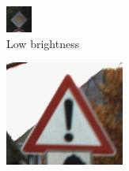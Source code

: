    \begin{figure}[H]
    \centering
    \begin{subfigure}{0.25\textwidth}
        \includegraphics[width=\linewidth]{images/figure11/1.png}
        \caption{Low brightness}
        \label{fig:subfig1}
    \end{subfigure}
    \begin{subfigure}{0.3\textwidth}
        \includegraphics[width=\linewidth]{images/figure11/3.png}

\end{subfigure}
\end{figure}
